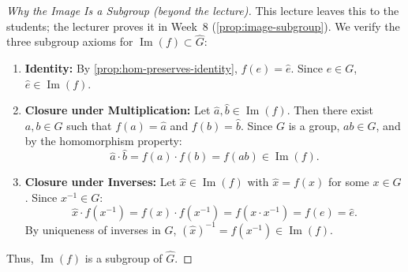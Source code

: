 \begin{content}


\begin{proof}[Why the Image Is a Subgroup (beyond the lecture)]
This lecture leaves this to the students; the lecturer proves it in Week~8 (\cref{prop:image-subgroup}). We verify the three subgroup axioms for $\operatorname{Im}(f) \subset \hat{G}$:
\begin{enumerate}[label=\textbf{(\arabic*)}]
    \item \textbf{Identity:} By \cref{prop:hom-preserves-identity}, $f(e) = \hat{e}$. Since $e \in G$, $\hat{e} \in \operatorname{Im}(f)$.
    \item \textbf{Closure under Multiplication:} Let $\hat{a}, \hat{b} \in \operatorname{Im}(f)$. Then there exist $a, b \in G$ such that $f(a) = \hat{a}$ and $f(b) = \hat{b}$. Since $G$ is a group, $ab \in G$, and by the homomorphism property:
    \[
    \hat{a} \cdot \hat{b} = f(a) \cdot f(b) = f(ab) \in \operatorname{Im}(f).
    \]
    \item \textbf{Closure under Inverses:} Let $\hat{x} \in \operatorname{Im}(f)$ with $\hat{x} = f(x)$ for some $x \in G$. Since $x^{-1} \in G$:
    \[
    \hat{x} \cdot f(x^{-1}) = f(x) \cdot f(x^{-1}) = f(x \cdot x^{-1}) = f(e) = \hat{e}.
    \]
    By uniqueness of inverses in $\hat{G}$, $(\hat{x})^{-1} = f(x^{-1}) \in \operatorname{Im}(f)$.
\end{enumerate}
Thus, $\operatorname{Im}(f)$ is a subgroup of $\hat{G}$.
\end{proof}
\end{content}

\begin{hidden}
\end{hidden}

